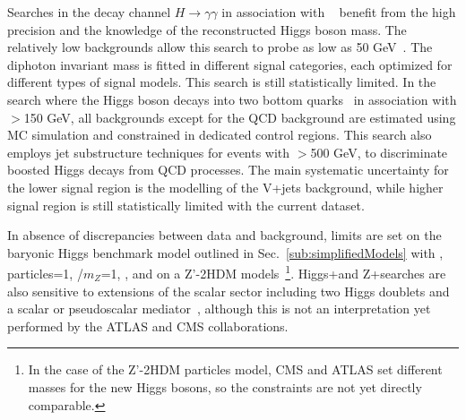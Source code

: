 Searches in the decay channel $H \rightarrow \gamma\gamma$ in association with \MET~\cite{CMS-PAS-EXO-16-054,Aaboud:2017uak} benefit from the high precision and the knowledge of the reconstructed Higgs boson mass. The relatively low backgrounds allow this search to probe \MET as low as 50 GeV~\cite{CMS-PAS-EXO-16-054}. The diphoton invariant mass is fitted in different signal categories, each optimized for different types of signal models. This search is still statistically limited. 
In the search where the Higgs boson decays into two bottom quarks~\cite{Aaboud:2017yqz}
in association with \MET$>$150 GeV, all backgrounds except for the QCD background are estimated using MC simulation and constrained in dedicated control regions. 
This search also employs jet substructure techniques for events with \MET$>$500 GeV, to discriminate boosted Higgs decays from QCD processes. The main systematic uncertainty for the lower \MET signal region is the modelling of the V+jets background, while higher \MET signal region is still statistically limited with the current dataset.

In absence of discrepancies between data and background,
limits are set on the baryonic Higgs benchmark model outlined in
Sec.~\ref{sub:simplifiedModels} with 
, \ginvisible particles=1, \ghZprimeZprime/$m_{Z}$=1, , 
and on a Z'-2HDM models~\footnote{ 
In the case of the Z'-2HDM particles model, CMS and ATLAS set different masses for the 
new Higgs bosons, 
so the constraints are not yet directly comparable.}. Higgs+\MET and Z+\MET searches are also sensitive to extensions of the scalar sector including two Higgs doublets and a scalar or pseudoscalar mediator~\cite{Bauer:2017ota,Ipek:2014gua,No:2015xqa,Goncalves:2016iyg,Bell:2016ekl}, although this is not an interpretation yet performed by the ATLAS and CMS collaborations. 

